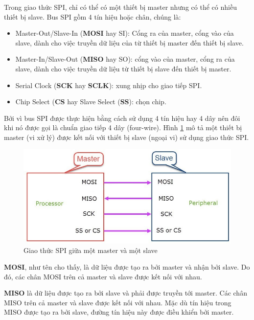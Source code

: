 Trong giao thức SPI, chỉ có thể có một thiết bị master nhưng có thể có nhiều thiết bị slave.
Bus SPI gồm 4 tín hiệu hoặc chân, chúng là:
\begin{itemize}
    \item Master-Out/Slave-In (\textbf{MOSI} hay SI): Cổng ra của master, cổng vào của slave, dành cho việc truyền dữ liệu của từ thiết bị master đến thiết bị slave.
    \item Master-In/Slave-Out (\textbf{MISO} hay SO): cổng vào của master, cổng ra của slave, dành cho việc truyền dữ liệu từ thiết bị slave đến thiết bị master.
    \item Serial Clock (\textbf{SCK} hay \textbf{SCLK}): xung nhịp cho giao tiếp SPI.
    \item Chip Select (\textbf{CS} hay Slave Select (\textbf{SS}): chọn chip.
\end{itemize}

Bởi vì bus SPI được thực hiện bằng cách sử dụng 4 tín hiệu hay 4 dây
nên đôi khi nó được gọi là chuẩn giao tiếp 4 dây (four-wire).
Hình \ref{fig:SPI_1M1S} mô tả một thiết bị master (vi xử lý) được kết nối với thiết bị slave (ngoại vi) sử dụng giao thức SPI.

\begin{figure}[ht]
\centering
\includegraphics[scale=0.6]{images/SPI-One-Master-One-Slave.jpg}
\caption{Giao thức SPI giữa một master và một slave}
\label{fig:SPI_1M1S}
\end{figure}

\textbf{MOSI}, như tên cho thấy, là dữ liệu được tạo ra bởi master và nhận bởi slave.
Do đó, các chân MOSI trên cả master và slave được kết nối với nhau.

\textbf{MISO} là dữ liệu được tạo ra bởi slave và phải được truyền tới master.
Các chân MISO trên cả master và slave được kết nối với nhau.
Mặc dù tín hiệu trong MISO được tạo ra bởi slave, đường tín hiệu này được điều khiển bởi master.

